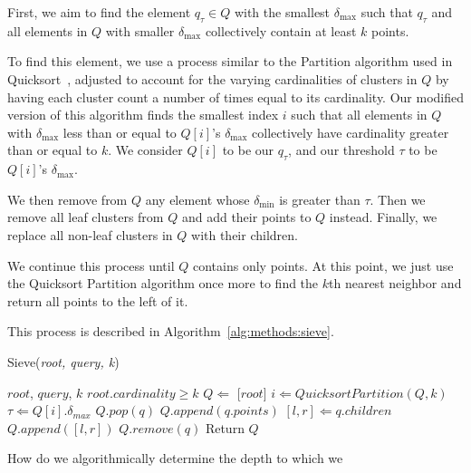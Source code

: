 First, we aim to find the element $q_{\tau} \in Q$ with the smallest $\delta_{\max}$ such that 
$q_{\tau}$ and all elements in $Q$ with smaller $\delta_{\max}$ collectively contain at least $k$ points. 

To find this element, we use a process similar to the Partition algorithm used in Quicksort~\cite{10.1093/comjnl/5.1.10}, adjusted to account for the varying cardinalities of clusters in $Q$ by having each cluster count a number of times equal to its cardinality.
Our modified version of this algorithm finds the smallest index $i$ such that all elements in $Q$ with $\delta_{\max}$ less than or equal to $Q[i]$'s $\delta_{\max}$ collectively have cardinality greater than or equal to $k$.
We consider $Q[i]$ to be our $q_{\tau}$, and our threshold $\tau$ to be $Q[i]$'s $\delta_{\max}$.

We then remove from $Q$ any element whose $\delta_{\min}$ is greater than $\tau$.
Then we remove all leaf clusters from $Q$ and add their points to $Q$ instead.
Finally, we replace all non-leaf clusters in $Q$ with their children. 

We continue this process until $Q$ contains only points.
At this point, we just use the Quicksort Partition algorithm once more to find the $k$th nearest neighbor and return all points to the left of it.

This process is described in Algorithm~\ref{alg:methods:sieve}. 

\begin{algorithm} %
    \caption{Sieve(\emph{root, query, k})} %
    \label{alg:methods:sieve} %
    \begin{algorithmic} %
        \REQUIRE $root$, $query$, $k$
        \REQUIRE $root.cardinality \geq k$
        \STATE $Q \Leftarrow$ [$root$]
            \STATE $i \Leftarrow QuicksortPartition(Q, k)$
            \STATE $\tau \Leftarrow Q[i].\delta_{max}$
                    \STATE $Q.pop(q)$
                \ENDIF
            \ENDFOR
                    \STATE $Q.append(q.points)$
                \ELSE
                    \STATE $[l, r] \Leftarrow q.children$
                    \STATE $Q.append([l, r])$   
                \ENDIF
                \STATE $Q.remove(q)$
            \ENDFOR 
        \ENDWHILE
        \STATE Return $Q$
    \end{algorithmic}How do we algorithmically determine the depth to which we
\end{algorithm}


